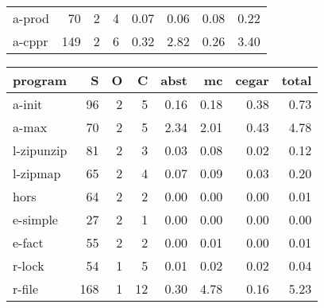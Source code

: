 \begin{table*}
\begin{center}
\begin{tabular}{|l|r|r|r|r|r|r|r|}
a-prod &        70&     2&      4 & 0.07 & 0.06 & 0.08 & 0.22 \\
a-cppr &        149&    2&      6 & 0.32 & 2.82 & 0.26 & 3.40 \\
\hline
\end{tabular}
\begin{tabular}{|l|r|r|r|r|r|r|r|}
\hline
program & S & O & C & abst & mc & cegar %
& total \\
\hline
a-init &        96&     2&      5 & 0.16 & 0.18 & 0.38 & 0.73\\
a-max &        70&     2&      5 & 2.34 & 2.01 & 0.43 & 4.78 \\
l-zipunzip&     81&     2&      3 & 0.03 & 0.08 & 0.02 & 0.12 \\
l-zipmap &      65&     2&      4 & 0.07 & 0.09 & 0.03 & 0.20 \\
hors&           64&     2&      2 & 0.00 & 0.00 & 0.00 & 0.01 \\
e-simple &      27&     2&      1 & 0.00 & 0.00 & 0.00 & 0.00 \\
e-fact &        55&     2&      2 & 0.00 & 0.01 & 0.00 & 0.01 \\
r-lock &        54&     1&      5 & 0.01 & 0.02 & 0.02 & 0.04 \\
r-file &        168&    1&      12 & 0.30 & 4.78 & 0.16 & 5.23 \\

\end{tabular}
\end{center}
\end{table*}
